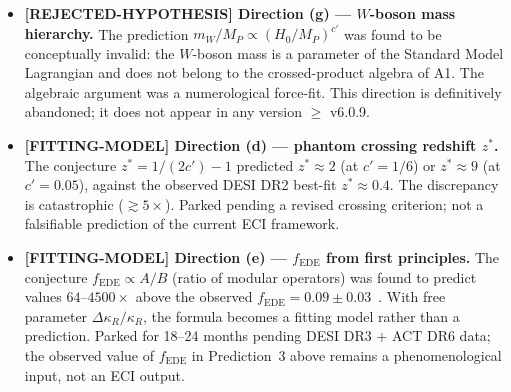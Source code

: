 \documentclass[reprint,amsmath,amssymb,aps,prd,superscriptaddress]{revtex4-2}
\providecommand{\1}{\mathbf{1}}
\begin{document}
\begin{itemize}
\item \textbf{[REJECTED-HYPOTHESIS] Direction (g) --- $W$-boson mass hierarchy.} The prediction $m_W/M_P \propto (H_0/M_P)^{c'}$ was found to be conceptually invalid: the $W$-boson mass is a parameter of the Standard Model Lagrangian and does not belong to the crossed-product algebra of A1. The algebraic argument was a numerological force-fit. This direction is definitively abandoned; it does not appear in any version $\geq$ v6.0.9.

\item \textbf{[FITTING-MODEL] Direction (d) --- phantom crossing redshift $z^*$.} The conjecture $z^* = 1/(2c') - 1$ predicted $z^* \approx 2$ (at $c'=1/6$) or $z^* \approx 9$ (at $c'=0.05$), against the observed DESI DR2 best-fit $z^* \approx 0.4$. The discrepancy is catastrophic ($\gtrsim 5\times$). Parked pending a revised crossing criterion; not a falsifiable prediction of the current ECI framework.

\item \textbf{[FITTING-MODEL] Direction (e) --- $f_{\mathrm{EDE}}$ from first principles.} The conjecture $f_{\mathrm{EDE}} \propto A/B$ (ratio of modular operators) was found to predict values $64$--$4500\times$ above the observed $f_{\mathrm{EDE}} = 0.09 \pm 0.03$~\cite{PoulinSmith2026}. With free parameter $\Delta\kappa_R/\kappa_R$, the formula becomes a fitting model rather than a prediction. Parked for 18--24 months pending DESI DR3 + ACT DR6 data; the observed value of $f_{\mathrm{EDE}}$ in Prediction~3 above remains a phenomenological input, not an ECI output.


\end{itemize}
\end{document}
